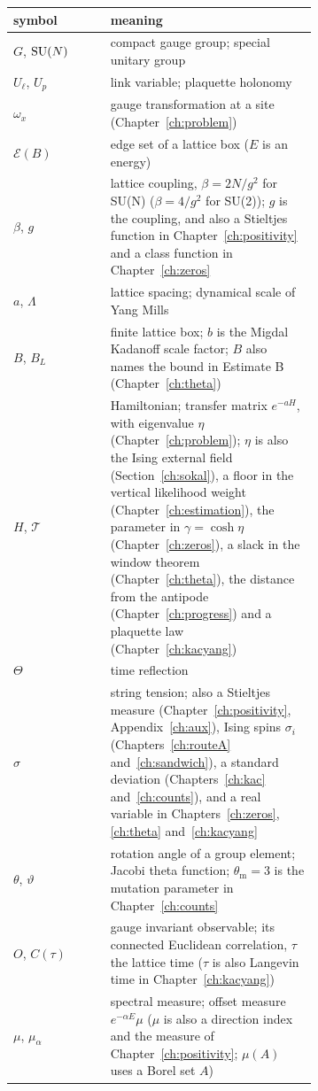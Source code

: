 \begingroup\scriptsize
\begin{longtable}{lp{0.68\linewidth}}
\toprule
symbol & meaning \\ \midrule
\endhead
$G$, $\mathrm{SU}(N)$ & compact gauge group; special unitary group \\
$U_\ell$, $U_p$ & link variable; plaquette holonomy \\
$\omega_x$ & gauge transformation at a site (Chapter~\ref{ch:problem}) \\
$\mathcal E(B)$ & edge set of a lattice box ($E$ is an energy) \\
$\beta$, $g$ & lattice coupling, $\beta=2N/g^2$ for SU(N) ($\beta=4/g^2$ for SU(2)); $g$ is the coupling, and also a Stieltjes function in Chapter~\ref{ch:positivity} and a class function in Chapter~\ref{ch:zeros} \\
$a$, $\Lambda$ & lattice spacing; dynamical scale of Yang Mills \\
$B$, $B_L$ & finite lattice box; $b$ is the Migdal Kadanoff scale factor; $B$ also names the bound in Estimate B (Chapter~\ref{ch:theta}) \\
$H$, $\mathcal T$ & Hamiltonian; transfer matrix $e^{-aH}$, with eigenvalue $\eta$ (Chapter~\ref{ch:problem}); $\eta$ is also the Ising external field (Section~\ref{ch:sokal}), a floor in the vertical likelihood weight (Chapter~\ref{ch:estimation}), the parameter in $\gamma=\cosh\eta$ (Chapter~\ref{ch:zeros}), a slack in the window theorem (Chapter~\ref{ch:theta}), the distance from the antipode (Chapter~\ref{ch:progress}) and a plaquette law (Chapter~\ref{ch:kacyang}) \\
$\Theta$ & time reflection \\ $\sigma$ & string tension; also a Stieltjes measure (Chapter~\ref{ch:positivity}, Appendix~\ref{ch:aux}), Ising spins $\sigma_i$ (Chapters~\ref{ch:routeA} and~\ref{ch:sandwich}), a standard deviation (Chapters~\ref{ch:kac} and~\ref{ch:counts}), and a real variable in Chapters~\ref{ch:zeros}, \ref{ch:theta} and~\ref{ch:kacyang} \\
$\theta$, $\vartheta$ & rotation angle of a group element; Jacobi theta function; $\theta_{\mathrm m}=3$ is the mutation parameter in Chapter~\ref{ch:counts} \\
$O$, $C(\tau)$ & gauge invariant observable; its connected Euclidean correlation, $\tau$ the lattice time ($\tau$ is also Langevin time in Chapter~\ref{ch:kacyang}) \\
$\mu$, $\mu_\alpha$ & spectral measure; offset measure $e^{-\alpha E}\mu$ ($\mu$ is also a direction index and the measure of Chapter~\ref{ch:positivity}; $\mu(A)$ uses a Borel set $A$) \\

\end{longtable}
